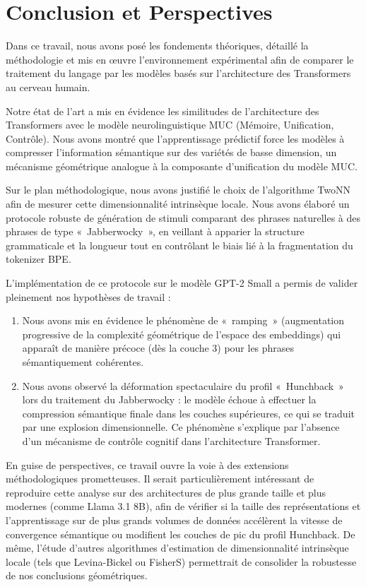 \chapter*{Conclusion et Perspectives}

Dans ce travail, nous avons posé les fondements théoriques, détaillé la méthodologie et mis en œuvre l'environnement expérimental afin de comparer le traitement du langage par les modèles basés sur l'architecture des Transformers au cerveau humain.

Notre état de l'art a mis en évidence les similitudes de l'architecture des Transformers avec le modèle neurolinguistique MUC (Mémoire, Unification, Contrôle). Nous avons montré que l'apprentissage prédictif force les modèles à compresser l'information sémantique sur des variétés de basse dimension, un mécanisme géométrique analogue à la composante d'unification du modèle MUC.

Sur le plan méthodologique, nous avons justifié le choix de l'algorithme TwoNN afin de mesurer cette dimensionnalité intrinsèque locale. Nous avons élaboré un protocole robuste de génération de stimuli comparant des phrases naturelles à des phrases de type «~Jabberwocky~», en veillant à apparier la structure grammaticale et la longueur tout en contrôlant le biais lié à la fragmentation du tokenizer BPE.

L'implémentation de ce protocole sur le modèle GPT-2 Small a permis de valider pleinement nos hypothèses de travail :
\begin{enumerate}
    \item Nous avons mis en évidence le phénomène de «~ramping~» (augmentation progressive de la complexité géométrique de l'espace des embeddings) qui apparaît de manière précoce (dès la couche 3) pour les phrases sémantiquement cohérentes.
    \item Nous avons observé la déformation spectaculaire du profil «~Hunchback~» lors du traitement du Jabberwocky : le modèle échoue à effectuer la compression sémantique finale dans les couches supérieures, ce qui se traduit par une explosion dimensionnelle. Ce phénomène s'explique par l'absence d'un mécanisme de contrôle cognitif dans l'architecture Transformer.
\end{enumerate}

En guise de perspectives, ce travail ouvre la voie à des extensions méthodologiques prometteuses. Il serait particulièrement intéressant de reproduire cette analyse sur des architectures de plus grande taille et plus modernes (comme Llama 3.1 8B), afin de vérifier si la taille des représentations et l'apprentissage sur de plus grands volumes de données accélèrent la vitesse de convergence sémantique ou modifient les couches de pic du profil Hunchback. De même, l'étude d'autres algorithmes d'estimation de dimensionnalité intrinsèque locale (tels que Levina-Bickel ou FisherS) permettrait de consolider la robustesse de nos conclusions géométriques.